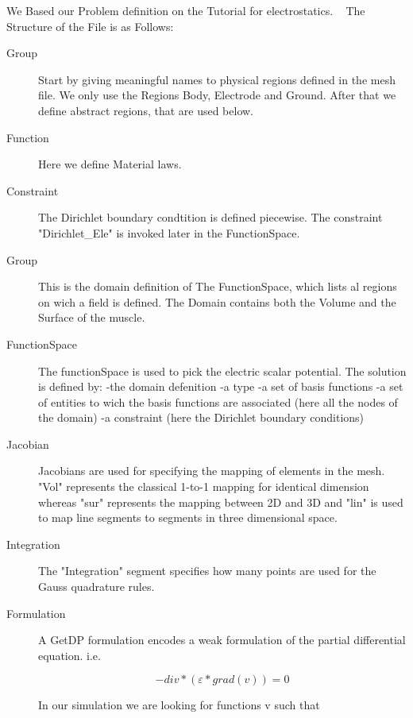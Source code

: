 \documentclass[preprint,journal]{vgtc}       %
\begin{document}
We Based our Problem definition on the Tutorial for electrostatics. ~\cite{Geuzaine2009}
The Structure of the File is as Follows:

\begin{description}
	\item[Group]
	Start by giving meaningful names to physical regions defined in the mesh file.
	We only use the Regions Body, Electrode and Ground. After that we define abstract regions, that are used below.
	\item[Function]
	Here we define Material laws.
	\item[Constraint]
	The Dirichlet boundary condtition is defined piecewise. The constraint "Dirichlet\_Ele" is invoked later in the FunctionSpace.
	\item[Group]
	This is the domain definition of The FunctionSpace, which lists al regions on wich a field is defined. The Domain contains both the Volume and the Surface of the muscle.
	\item[FunctionSpace]
	The functionSpace is used to pick the electric scalar potential. The solution is defined  by:\newline
	-the domain defenition\newline
	-a type\newline
	-a set of basis functions\newline %
	-a set of entities to wich the basis functions are associated (here all the nodes of the domain)\newline
	-a constraint (here the Dirichlet boundary conditions)\newline
	\item[Jacobian] %
	Jacobians are used for specifying the mapping of elements in the mesh.
	"Vol" represents the classical 1-to-1 mapping for identical dimension whereas
	"sur" represents the mapping between 2D and 3D and "lin" is used to map line segments to segments in three dimensional space.
	\item[Integration]
	The "Integration" segment specifies how many points are used for the Gauss quadrature rules. %
	\item[Formulation]
	A GetDP formulation encodes a weak formulation of the partial differential equation. i.e. 
	
	\begin{equation*}
	{-div}*(\varepsilon *grad{(v)}) = 0
	\end{equation*}
	
	In our simulation we are looking for functions v such that 
	

\end{description}
\end{document}
